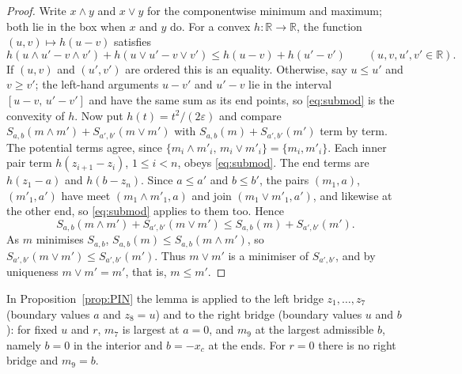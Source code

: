 \documentclass[11pt,a4paper]{article}
\theoremstyle{definition}
\theoremstyle{remark}
\newcommand{\R}{\mathbb{R}}
\newcommand{\xc}{x_c}
\begin{document}
\begin{proof}
Write $x\wedge y$ and $x\vee y$ for the componentwise minimum and maximum; both lie in the box when $x$ and $y$ do. For a convex $h:\R\to\R$, the function $(u,v)\mapsto h(u-v)$ satisfies
\begin{equation}\label{eq:submod}
h(u\wedge u'-v\wedge v')+h(u\vee u'-v\vee v')\le h(u-v)+h(u'-v')\qquad(u,v,u',v'\in\R).
\end{equation}
If $(u,v)$ and $(u',v')$ are ordered this is an equality. Otherwise, say $u\le u'$ and $v\ge v'$; the left-hand arguments $u-v'$ and $u'-v$ lie in the interval $[u-v,\,u'-v']$ and have the same sum as its end points, so \eqref{eq:submod} is the convexity of $h$. Now put $h(t)=t^2/(2\varepsilon)$ and compare $S_{a,b}(m\wedge m')+S_{a',b'}(m\vee m')$ with $S_{a,b}(m)+S_{a',b'}(m')$ term by term. The potential terms agree, since $\{m_i\wedge m'_i,\,m_i\vee m'_i\}=\{m_i,m'_i\}$. Each inner pair term $h(z_{i+1}-z_i)$, $1\le i<n$, obeys \eqref{eq:submod}. The end terms are $h(z_1-a)$ and $h(b-z_n)$. Since $a\le a'$ and $b\le b'$, the pairs $(m_1,a)$, $(m'_1,a')$ have meet $(m_1\wedge m'_1,a)$ and join $(m_1\vee m'_1,a')$, and likewise at the other end, so \eqref{eq:submod} applies to them too. Hence
\[
S_{a,b}(m\wedge m')+S_{a',b'}(m\vee m')\le S_{a,b}(m)+S_{a',b'}(m').
\]
As $m$ minimises $S_{a,b}$, $S_{a,b}(m)\le S_{a,b}(m\wedge m')$, so $S_{a',b'}(m\vee m')\le S_{a',b'}(m')$. Thus $m\vee m'$ is a minimiser of $S_{a',b'}$, and by uniqueness $m\vee m'=m'$, that is, $m\le m'$.
\end{proof}

In Proposition~\ref{prop:PIN} the lemma is applied to the left bridge $z_1,\dots,z_7$ (boundary values $a$ and $z_8=u$) and to the right bridge (boundary values $u$ and $b$): for fixed $u$ and $r$, $m_7$ is largest at $a=0$, and $m_9$ at the largest admissible $b$, namely $b=0$ in the interior and $b=-\xc$ at the ends. For $r=0$ there is no right bridge and $m_9=b$.
\end{document}
